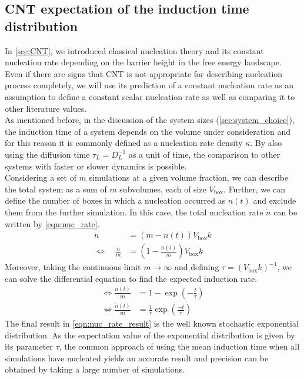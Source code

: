 \subsection{CNT expectation of the induction time distribution}
\label{sec:induction_time_expectation}
In \autoref{sec:CNT}, we introduced classical nucleation theory and its constant nucleation rate depending on the barrier height in the free energy landscape. Even if there are signs that CNT is not appropriate for describing nucleation process completely, we will use its prediction of a constant nucleation rate as an assumption to define a constant scalar nucleation rate as well as comparing it to other literature values.\\

As mentioned before, in the discussion of the system sizes (\autoref{sec:system_choice}), the induction time of a system depends on the volume under consideration and for this reason it is commonly defined as a nucleation rate density $\kappa$. By also using the diffusion time $\tau_L = D_L^{-1}$ as a unit of time, the comparison to other systems with faster or slower dynamics is possible.\\

Considering a set of $m$ simulations at a given volume fraction, we can describe the total system as a sum of $m$ subvolumes, each of size $V_{\text{box}}$. Further, we can define the number of boxes in which a nucleation occurred as $n(t)$ and exclude them from the further simulation. In this case, the total nucleation rate $ \dot{n} $ can be written by \autoref{eqn:nuc_rate}.
\begin{align}
\label{eqn:nuc_rate}
\dot{n} &= (m - n(t))V_{\text{box}}k\\
\Leftrightarrow \quad \!\frac{\dot{n}}{m} &= \left(1 - \frac{n(t)}{m}\right) V_{\text{box}}k
\end{align}
Moreover, taking the continuous limit $m \rightarrow \infty $ and defining $\tau = (V_{\text{box}} k)^{-1}$, we can solve the differential equation to find the expected induction rate. 
\begin{align}
\Leftrightarrow \frac{n(t)}{m} &= 1 - \exp\left( -\frac{t}{\tau} \right)\\
\label{eqn:nuc_rate_result}
\Leftrightarrow \frac{\dot{n}(t)}{m} &= \frac{1}{\tau} \exp\left( \frac{-t}{\tau} \right) 
\end{align}
The final result in \autoref{eqn:nuc_rate_result} is the well known stochastic exponential distribution. As the expectation value of the exponential distribution is given by its parameter $\tau$, the common approach of using the mean induction time when all simulations have nucleated yields an accurate result and precision can be obtained by taking a large number of simulations.
